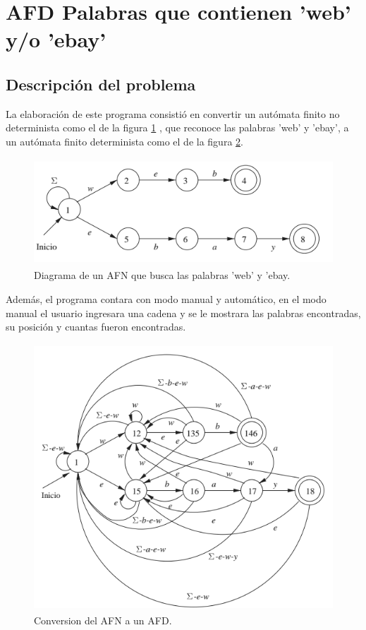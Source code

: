 \section{AFD Palabras que contienen 'web' y/o 'ebay'}
	\subsection{Descripción del problema}
	La elaboración de este programa consistió en convertir un autómata finito no determinista como el de la figura \ref{fig:diagrama1} , que reconoce las palabras 'web' y 'ebay', a un autómata finito determinista como el de la figura \ref{fig:diagrama2}.
	\begin{figure}[H]
		\begin{center}
		\includegraphics[width=12cm, height=4cm]{img/webay-AFND.png}
		\caption{Diagrama de un AFN que busca las palabras 'web' y 'ebay.\cite{LIBRO}}
		\label{fig:diagrama1}
		\end{center}
	\end{figure}
	Además, el programa contara con modo manual y automático, en el modo manual el usuario ingresara una cadena y se le mostrara las palabras encontradas, su posición y cuantas fueron encontradas.
	\begin{figure}[H]
		\begin{center}
			\includegraphics[width=12cm, height=10cm]{img/webay-AFD.png}
			\caption{Conversion del AFN a un AFD. \cite{LIBRO}}
			\label{fig:diagrama2}
		\end{center}
	\end{figure}
